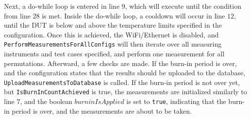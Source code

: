 Next, a do-while loop is entered in line $9$, which will execute until the condition  from line $28$ is met. Inside the do-while loop, a cooldown will occur in line $12$, until the DUT is below and above the temperature limits specified in the configuration. Once this is achieved, the WiFi/Ethernet is disabled, and \texttt{PerformMeasurementsForAllConfigs} will then iterate over all measuring instruments and test cases specified, and perform one measurement for all permutations. Afterward, a few checks are made. If the burn-in period is over, and the configuration states that the results should be uploaded to the database, \texttt{UploadMeasurementsToDatabase} is called. If the burn-in period is not over yet, but \texttt{IsBurnInCountAchieved} is true, the measurements are initialized similarly to line $7$, and the boolean $burninIsApplied$ is set to \texttt{true}, indicating that the burn-in period is over, and the measurements are about to be taken. 
